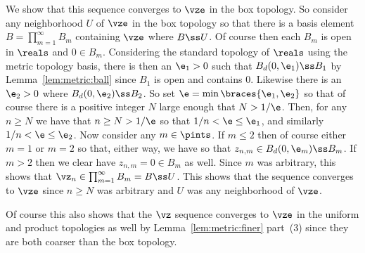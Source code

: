 {{    We show that this sequence converges to $\vze$ in the box topology.
    So consider any neighborhood $U$ of $\vze$ in the box topology so that there is a basis element $B = \prod_{m=1}^\infty B_m$ containing $\vze$ where $B \ss U$.
    Of course then each $B_m$ is open in $\reals$ and $0 \in B_m$.
    Considering the standard topology of $\reals$ using the metric topology basis, there is then an $\e_1 > 0$ such that $B_d(0, \e_1) \ss B_1$ by Lemma~\ref{lem:metric:ball} since $B_1$ is open and contains $0$.
    Likewise there is an $\e_2 > 0$ where $B_d(0, \e_2) \ss B_2$.
    So set $\e = \min\braces{\e_1, \e_2}$ so that of course there is a positive integer $N$ large enough that $N > 1/\e$.
    Then, for any $n \geq N$ we have that $n \geq N > 1/\e$ so that $1/n < \e \leq \e_1$, and similarly $1/n < \e \leq \e_2$.
    Now consider any $m \in \pints$.
    If $m \leq 2$ then of course either $m = 1$ or $m = 2$ so that, either way, we have
    so that $z_{n,m} \in B_d(0, \e_m) \ss B_m$.
    If $m > 2$ then we clear have $z_{n,m} = 0 \in B_m$ as well.
    Since $m$ was arbitrary, this shows that $\vz_n \in \prod_{m=1}^\infty B_m = B \ss U$.
    This shows that the sequence converges to $\vze$ since $n \geq N$ was arbitrary and $U$ was any neighborhood of $\vze$.

    Of course this also shows that the $\vz$ sequence converges to $\vze$ in the uniform and product topologies as well by Lemma~\ref{lem:metric:finer} part~(3) since they are both coarser than the box topology.
  }
}

